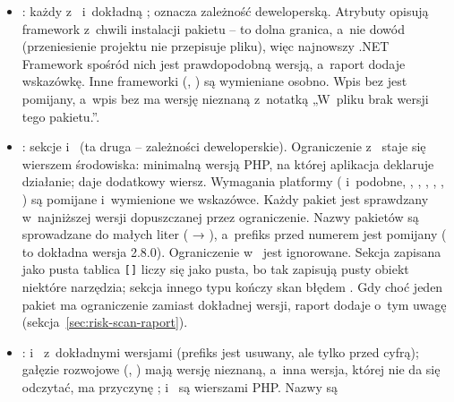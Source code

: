\begin{itemize}
  \item \textbf{}: każdy  z~
        i~dokładną ;  oznacza
        zależność deweloperską. Atrybuty  opisują framework z~chwili
        instalacji pakietu -- to dolna granica, a~nie dowód (przeniesienie projektu nie
        przepisuje pliku), więc najnowszy .NET Framework spośród nich jest prawdopodobną wersją,
        a~raport dodaje wskazówkę. Inne frameworki (, )
        są wymieniane osobno. Wpis bez  jest pomijany, a~wpis bez
         ma wersję nieznaną z~notatką „W~pliku brak wersji tego pakietu.”.
  \item \textbf{}: sekcje  i~
        (ta druga -- zależności deweloperskie). Ograniczenie  z~
        staje się wierszem środowiska: minimalną wersją PHP, na której aplikacja deklaruje
        działanie;  daje dodatkowy wiersz. Wymagania platformy
        ( i~podobne, , ,
        , , ,
        ) są pomijane i~wymienione we wskazówce. Każdy pakiet
        jest sprawdzany w~najniższej wersji dopuszczanej przez ograniczenie. Nazwy pakietów są
        sprowadzane do małych liter ( → ), a~prefiks
         przed numerem jest pomijany ( to dokładna wersja 2.8.0).
        Ograniczenie  w~ jest ignorowane. Sekcja zapisana
        jako pusta tablica \texttt{[]} liczy się jako pusta, bo tak zapisują pusty obiekt
        niektóre narzędzia; sekcja innego typu kończy skan błędem
        . Gdy choć jeden pakiet ma ograniczenie zamiast dokładnej
        wersji, raport dodaje o~tym uwagę (sekcja~\ref{sec:risk-scan-raport}).
  \item \textbf{}:  i~
        z~dokładnymi wersjami (prefiks  jest usuwany, ale tylko przed cyfrą);
        gałęzie rozwojowe (, ) mają wersję nieznaną, a~inna
        wersja, której nie da się odczytać, ma przyczynę ;
         i~ są wierszami PHP. Nazwy są

\end{itemize}
